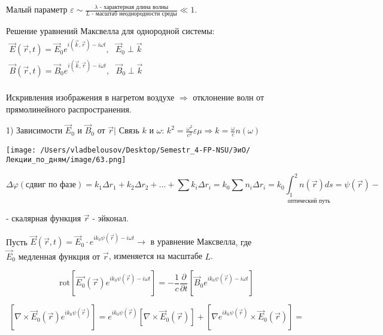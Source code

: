\documentclass[12pt, a4paper]{report}
\begin{document}
Малый параметр \(\displaystyle  \varepsilon \sim  \frac{ \lambda\text{ - характерная длина волны} }{L \text{  - масштаб неоднородности среды}}  \ll 1   \).

Решение уравнений Максвелла для однородной системы: \( \begin{aligned}
\vec{E } (\vec{r },t     ) = \vec{E }_0  e^{i (\vec{k } ,\vec{r}) - i \omega t  }  , \text{  }  \vec{E }_0 \perp \vec{k } \\
\vec{B } (\vec{r },t     ) = \vec{B }_0  e^{i (\vec{k } ,\vec{r}) - i \omega t  }  , \text{  }  \vec{B }_0 \perp \vec{k } \\
\end{aligned} \) 


Искривления изображения в нагретом воздухе \( \Rightarrow \)  отклонение волн от прямолинейного распространения.

1) Зависимости \( \vec{E } _0  \) и \( \vec{B } _0  \) от \( \vec{r } | \)  Связь \( k \) и \( \omega \): \( \displaystyle  k ^2 = \frac{ \omega ^2 } { c ^2 }\varepsilon \mu \Rightarrow k = \frac{\omega }{c } n(\omega)   \) 

\begin{center}
    \texttt{[image: /Users/vladbelousov/Desktop/Semestr\_4-FP-NSU/ЭиО/Лекции\_по\_дням/image/63.png]}
\end{center}

\[ \Delta \varphi (\text{сдвиг по фазе} ) = k_1 \Delta r_1 + k_2 \Delta r_2 +... + \sum  k_i \Delta r_i = k_0 \sum n_i \Delta r_i = k_0 \underset{\text{оптический путь} }{\int_{1 }^{2 } n(\vec{r } )ds }= \psi (\vec{r} ) -\] 

- скалярная функция \( \vec{r}  \) - эйконал.

Пусть \( \vec{E } ( \vec{r } ,t ) = \vec{E } _0  \cdot e^{ i k_0 \psi (\vec{r } ) - i \omega t}  \to  \text{ в уравнение Максвелла} \), где \( \vec{E } _0\text { медленная функция от  } \vec{r }   \),  изменяется на масштабе \( L  \).

\[ \mathrm{rot } \left[ \vec{E_0 }(\vec{r } ) e^{i k_0 \psi (\vec{r } )- i \omega t }   \right] = -\frac{1}{c} \frac{\partial  }{\partial  t } \left[ \vec{B }_0 e^{i k_0 \psi (\vec{r } )- i \omega t}   \right]   \] 

\[ \left[ \nabla \times  \vec{E } _0 ( \vec{r } ) e^{i k_0 \psi (\vec{r} )}  \right] = e^{ i k_0 \psi (\vec{r} )} \left[ \nabla \times  \vec{E } _0 (\vec{r } ) \right] + \left[ \nabla e^{ i k_0 \psi (\vec{r } )} \times  \vec{E }  _ 0 (\vec{r} )  \right] = \] 
\end{document}
